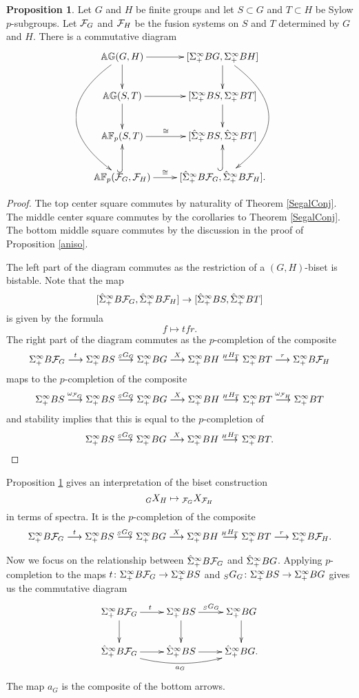 \documentclass[10pt]{amsart}
\theoremstyle{definition}
\newtheorem{proposition}[theorem]{Proposition}
\begin{document}
\begin{proposition} \label{bigdiagram}
Let $G$ and $H$ be finite groups and let $S \subset G$ and $T \subset H$ be Sylow $p$-subgroups. Let $\mathcal{F}_G$ and $\mathcal{F}_H$ be the fusion systems on $S$ and $T$ determined by $G$ and $H$. There is a commutative diagram
\[
\xymatrix{\AG(G,H) \ar@/_4pc/[ddd] \ar[r] \ar[d] & [\Sinfp BG, \Sinfp BH] \ar[d] \ar@/^4pc/[ddd] \\ \AG(S,T) \ar[r] \ar[d]  & [\Sinfp BS, \Sinfp BT] \ar[d] \\ \AF(S,T) \ar[r]^-{\cong} & [\Sinfpp BS, \Sinfpp BT] \\ \AF(\cF_G, \cF_H) \ar[r]^-{\cong} \ar@{^{(}->}[u] & [\Sinfpp B\cF_G, \Sinfpp B\cF_H]. \ar@{^{(}->}[u]}
\]
\end{proposition}

\begin{proof}
The top center square commutes by naturality of Theorem \ref{SegalConj}. The middle center square commutes by the corollaries to Theorem \ref{SegalConj}. The bottom middle square commutes by the discussion in the proof of Proposition \ref{aniso}.

The left part of the diagram commutes as the restriction of a $(G,H)$-biset is bistable. Note that the map
\[
[\hat{\Sigma}^{\infty}_{+} B\mathcal{F}_G, \hat{\Sigma}^{\infty}_{+} B\mathcal{F}_H] \rightarrow [\hat{\Sigma}^{\infty}_{+} BS, \hat{\Sigma}^{\infty}_{+} BT]
\]
is given by the formula
\[
f \mapsto tfr.
\]
The right part of the diagram commutes as the $p$-completion of the composite
\[
\Sigma^{\infty}_{+} B\mathcal{F}_G \overset{t}{\longrightarrow} \Sigma^{\infty}_{+} BS \overset{{}_{S}G_{G}}{\longrightarrow} \Sigma^{\infty}_{+} BG \overset{X}{\longrightarrow} \Sigma^{\infty}_{+} BH \overset{{}_{H}H_{T}}{\longrightarrow} \Sigma^{\infty}_{+} BT \overset{r}{\longrightarrow} \Sigma^{\infty}_{+} B\mathcal{F}_H
\]
maps to the $p$-completion of the composite
\[
\Sigma^{\infty}_{+} BS \overset{\omega_{\mathcal{F}_G}}{\longrightarrow} \Sigma^{\infty}_{+} BS \overset{{}_{S}G_{G}}{\longrightarrow} \Sigma^{\infty}_{+} BG \overset{X}{\longrightarrow} \Sigma^{\infty}_{+} BH \overset{{}_{H}H_{T}}{\longrightarrow} \Sigma^{\infty}_{+} BT \overset{\omega_{\mathcal{F}_H}}{\longrightarrow} \Sigma^{\infty}_{+} BT
\]
and stability implies that this is equal to the $p$-completion of
\[
\Sigma^{\infty}_{+} BS \overset{{}_{S}G_{G}}{\longrightarrow} \Sigma^{\infty}_{+} BG \overset{X}{\longrightarrow} \Sigma^{\infty}_{+} BH \overset{{}_{H}H_{T}}{\longrightarrow} \Sigma^{\infty}_{+} BT.
\qedhere\]
\end{proof}

Proposition \ref{bigdiagram} gives an interpretation of the biset construction
\[
{}_{G}X_{H} \mapsto {}_{\mathcal{F}_G}X_{\mathcal{F}_H}
\]
in terms of spectra. It is the $p$-completion of the composite
\[
\Sigma^{\infty}_{+} B\mathcal{F}_G \overset{t}{\longrightarrow} \Sigma^{\infty}_{+} BS \overset{{}_{S}G_{G}}{\longrightarrow} \Sigma^{\infty}_{+} BG \overset{X}{\longrightarrow} \Sigma^{\infty}_{+} BH \overset{{}_{H}H_{T}}{\longrightarrow} \Sigma^{\infty}_{+} BT \overset{r}{\longrightarrow} \Sigma^{\infty}_{+} B\mathcal{F}_H.
\]


Now we focus on the relationship between $\hat{\Sigma}^{\infty}_{+} B\mathcal{F}_G$ and $\hat{\Sigma}^{\infty}_{+} BG$. Applying $p$-completion to the maps $t \colon \Sigma^{\infty}_{+} B\mathcal{F}_G \rightarrow \Sigma^{\infty}_{+} BS$ and ${}_{S}G_{G} \colon \Sigma^{\infty}_{+} BS \rightarrow \Sigma^{\infty}_{+} BG$ gives us the commutative diagram
\begin{equation} \label{aGdiagram}
\xymatrix{\Sinfp B\cF_G \ar[r]^{t} \ar[d] & \Sinfp BS \ar[r]^{{}_{S}G_{G}} \ar[d] & \Sinfp BG \ar[d] \\ \Sinfpp B\cF_G \ar[r] \ar@/_1pc/[rr]_{a_G}  & \Sinfpp BS  \ar[r] & \Sinfpp BG.}
\end{equation}
The map $a_G$ is the composite of the bottom arrows.
\end{document}
